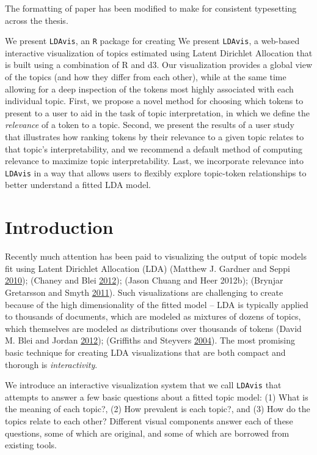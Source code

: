 \documentclass[12pt,]{isuthesis}
\begin{document}
The formatting of paper has been modified to make for consistent
typesetting across the thesis.


We present \texttt{LDAvis}, an \texttt{R} package for creating We
present \texttt{LDAvis}, a web-based interactive visualization of topics
estimated using Latent Dirichlet Allocation that is built using a
combination of R and d3. Our visualization provides a global view of the
topics (and how they differ from each other), while at the same time
allowing for a deep inspection of the tokens most highly associated with
each individual topic. First, we propose a novel method for choosing
which tokens to present to a user to aid in the task of topic
interpretation, in which we define the \emph{relevance} of a token to a
topic. Second, we present the results of a user study that illustrates
how ranking tokens by their relevance to a given topic relates to that
topic's interpretability, and we recommend a default method of computing
relevance to maximize topic interpretability. Last, we incorporate
relevance into \texttt{LDAvis} in a way that allows users to flexibly
explore topic-token relationships to better understand a fitted LDA
model.

\section{Introduction}\label{section:introduction}

Recently much attention has been paid to visualizing the output of topic
models fit using Latent Dirichlet Allocation (LDA) (Matthew J. Gardner
and Seppi \protect\hyperlink{ref-Gardner}{2010}); (Chaney and Blei
\protect\hyperlink{ref-Blei-2012}{2012}); (Jason Chuang and Heer 2012b);
(Brynjar Gretarsson and Smyth \protect\hyperlink{ref-Gretarsson}{2011}).
Such visualizations are challenging to create because of the high
dimensionality of the fitted model -- LDA is typically applied to
thousands of documents, which are modeled as mixtures of dozens of
topics, which themselves are modeled as distributions over thousands of
tokens (David M. Blei and Jordan
\protect\hyperlink{ref-Blei-2003}{2012}); (Griffiths and Steyvers
\protect\hyperlink{ref-Griffiths}{2004}). The most promising basic
technique for creating LDA visualizations that are both compact and
thorough is \emph{interactivity}.

We introduce an interactive visualization system that we call
\texttt{LDAvis} that attempts to answer a few basic questions about a
fitted topic model: (1) What is the meaning of each topic?, (2) How
prevalent is each topic?, and (3) How do the topics relate to each
other? Different visual components answer each of these questions, some
of which are original, and some of which are borrowed from existing
tools.
\end{document}
